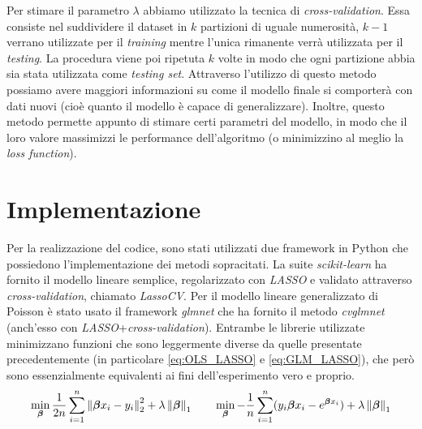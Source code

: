 Per stimare il parametro $\lambda$ abbiamo utilizzato la tecnica di \textit{cross-validation}. Essa consiste nel suddividere il 
dataset in $k$ partizioni di uguale numerosità, $k-1$ verrano utilizzate per il \textit{training} mentre l'unica rimanente 
verrà utilizzata per il \textit{testing}. La procedura viene poi ripetuta $k$ volte in modo che ogni partizione abbia sia 
stata utilizzata come \textit{testing set}. Attraverso l'utilizzo di questo metodo possiamo avere maggiori informazioni su 
come il modello finale si comporterà con dati nuovi (cioè quanto il modello è capace di generalizzare). Inoltre, questo 
metodo permette appunto di stimare certi parametri del modello, in modo che il loro valore massimizzi le performance 
dell'algoritmo (o minimizzino al meglio la \textit{loss function}).   

\section{Implementazione}
\bigskip

Per la realizzazione del codice, sono stati utilizzati due framework in Python che possiedono l'implementazione dei metodi
sopracitati. La suite \textit{scikit-learn} \cite{scikit-learn} ha fornito il modello lineare semplice, regolarizzato con 
\textit{LASSO} e validato attraverso \textit{cross-validation}, chiamato \textit{LassoCV}. Per il modello lineare 
generalizzato di Poisson è stato usato il framework \textit{glmnet} \cite{GLMNET} che ha fornito il metodo \textit{cvglmnet} 
(anch'esso con \textit{LASSO}+\textit{cross-validation}). Entrambe le librerie utilizzate minimizzano funzioni che sono 
leggermente diverse da quelle presentate precedentemente (in particolare \eqref{eq:OLS_LASSO} e \eqref{eq:GLM_LASSO}), che 
però sono essenzialmente equivalenti ai fini dell'esperimento vero e proprio. 
\begin{gather}
	\min_{\bm{\beta}} \frac{1}{2n}\sum_{i=1}^n \left\lVert\bm{\beta} x_i -y_i\right\rVert_{2}^2 + \lambda\left\lVert\bm{\beta}\right\rVert_1 	\qquad
	\min_{\bm{\beta}} -\frac{1}{n}\sum_{i=1}^n (y_i\bm{\beta} x_i - e^{\bm{\beta} x_i} ) + \lambda\left\lVert\bm{\beta}\right\rVert_1
\end{gather}

\newpage